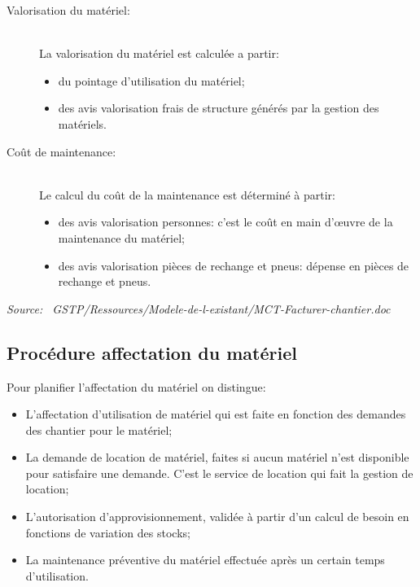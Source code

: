 \documentclass[twoside]{article}
\begin{document}
    \begin{description}
	    \item [Valorisation du matériel:]\hfill\\
            La valorisation du matériel est calculée a partir:
		    \begin{itemize}
			    \item du pointage d'utilisation du matériel;
			    \item des avis valorisation frais de structure générés par
                    la gestion des matériels.
		    \end{itemize}	
    
    	\item [Coût de maintenance:]\hfill\\
    		Le calcul du coût de la maintenance est déterminé à partir:
		    \begin{itemize}
			    \item des avis valorisation personnes: c'est le coût en
                    main d'\oe{}uvre de la maintenance du matériel;
			    \item des avis valorisation pièces de rechange et pneus:
                    dépense en pièces de rechange et pneus.
		    \end{itemize}

    \end{description}

    {\sl Source:~{\ttfamily 
        GSTP/Ressources/Modele-de-l-existant/MCT-Facturer-chantier.doc}}

\subsection{Procédure affectation du matériel}

	Pour planifier l'affectation du matériel on distingue:
	\begin{itemize}
		\item L'affectation d'utilisation de matériel qui est faite en
            fonction des demandes des chantier pour le matériel;
		\item La demande de location de matériel, faites si aucun matériel
            n'est disponible pour satisfaire une demande. C'est le service de
            location qui fait la gestion de location;
		\item L'autorisation d'approvisionnement, validée à partir d'un
            calcul de besoin en fonctions de variation des stocks;
		\item La maintenance préventive du matériel effectuée après un
            certain temps d'utilisation.
	\end{itemize}
\end{document}
